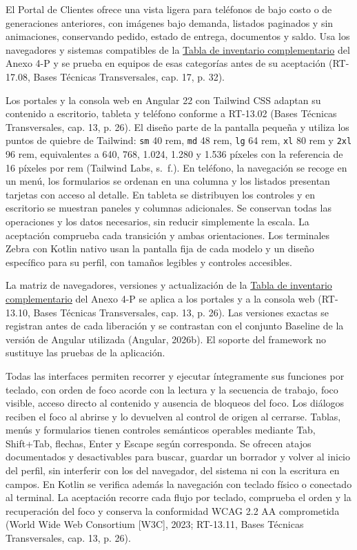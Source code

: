 El Portal de Clientes ofrece una vista ligera para teléfonos de bajo costo o de generaciones anteriores, con imágenes bajo demanda, listados paginados y sin animaciones, conservando pedido, estado de entrega, documentos y saldo. Usa los navegadores y sistemas compatibles de la \href{LAFROX-Subdocumento4-Anexos.pdf#tab:inventario-software}{Tabla de inventario complementario} del Anexo 4-P y se prueba en equipos de esas categorías antes de su aceptación (RT-17.08, Bases Técnicas Transversales, cap. 17, p. 32).

Los portales y la consola web en Angular 22 con Tailwind CSS adaptan su contenido a escritorio, tableta y teléfono conforme a RT-13.02 (Bases Técnicas Transversales, cap. 13, p. 26). El diseño parte de la pantalla pequeña y utiliza los puntos de quiebre de Tailwind: \texttt{sm} 40 rem, \texttt{md} 48 rem, \texttt{lg} 64 rem, \texttt{xl} 80 rem y \texttt{2xl} 96 rem, equivalentes a 640, 768, 1.024, 1.280 y 1.536 píxeles con la referencia de 16 píxeles por rem (Tailwind Labs, s.~f.). En teléfono, la navegación se recoge en un menú, los formularios se ordenan en una columna y los listados presentan tarjetas con acceso al detalle. En tableta se distribuyen los controles y en escritorio se muestran paneles y columnas adicionales. Se conservan todas las operaciones y los datos necesarios, sin reducir simplemente la escala. La aceptación comprueba cada transición y ambas orientaciones. Los terminales Zebra con Kotlin nativo usan la pantalla fija de cada modelo y un diseño específico para su perfil, con tamaños legibles y controles accesibles.

La matriz de navegadores, versiones y actualización de la \href{LAFROX-Subdocumento4-Anexos.pdf#tab:inventario-software}{Tabla de inventario complementario} del Anexo 4-P se aplica a los portales y a la consola web (RT-13.10, Bases Técnicas Transversales, cap. 13, p. 26). Las versiones exactas se registran antes de cada liberación y se contrastan con el conjunto Baseline de la versión de Angular utilizada (Angular, 2026b). El soporte del framework no sustituye las pruebas de la aplicación.

Todas las interfaces permiten recorrer y ejecutar íntegramente sus funciones por teclado, con orden de foco acorde con la lectura y la secuencia de trabajo, foco visible, acceso directo al contenido y ausencia de bloqueos del foco. Los diálogos reciben el foco al abrirse y lo devuelven al control de origen al cerrarse. Tablas, menús y formularios tienen controles semánticos operables mediante Tab, Shift+Tab, flechas, Enter y Escape según corresponda. Se ofrecen atajos documentados y desactivables para buscar, guardar un borrador y volver al inicio del perfil, sin interferir con los del navegador, del sistema ni con la escritura en campos. En Kotlin se verifica además la navegación con teclado físico o conectado al terminal. La aceptación recorre cada flujo por teclado, comprueba el orden y la recuperación del foco y conserva la conformidad WCAG 2.2 AA comprometida (World Wide Web Consortium [W3C], 2023; RT-13.11, Bases Técnicas Transversales, cap. 13, p. 26).


